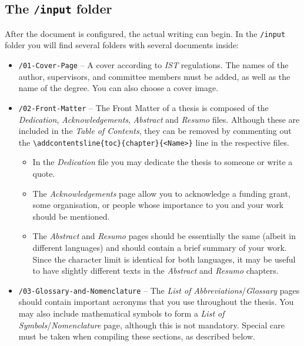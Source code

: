 \subsection{The {\normalfont\texttt{/input}} folder} %

After the document is configured, the actual writing can begin. In the \texttt{/input} folder you will find several folders with several documents inside:

\begin{itemize}
\item \texttt{/01-Cover-Page} -- A cover according to \textit{IST} regulations. The names of the author, supervisors, and committee members must be added, as well as the name of the degree. You can also choose a cover image.

\item \texttt{/02-Front-Matter} -- The Front Matter of a thesis is composed of the \textit{Dedication}, \textit{Acknowledgements}, \textit{Abstract} and \textit{Resumo} files. Although these are included in the \textit{Table of Contents}, they can be removed by commenting out the \Verb*|\addcontentsline{toc}{chapter}{<Name>}| line in the respective files.
	
\begin{itemize}
	\item In the \textit{Dedication} file you may dedicate the thesis to someone or write a quote. 
	
	\item The \textit{Acknowledgements} page allow you to acknowledge a funding grant, some organisation, or people whose importance to you and your work should be mentioned. 
	
	\item The \textit{Abstract} and \textit{Resumo} pages should be essentially the same (albeit in different languages) and should contain a brief summary of your work. Since the character limit is identical for both languages, it may be useful to have slightly different texts in the \textit{Abstract} and \textit{Resumo} chapters. 
\end{itemize}	

\item \texttt{/03-Glossary-and-Nomenclature} -- The \textit{List of Abbreviations}/\textit{Glossary} pages should contain important acronyms that you use throughout the thesis. You may also include mathematical symbols to form a \textit{List of Symbols}/\textit{Nomenclature} page, although this is not mandatory. Special care must be taken when compiling these sections, as described below.


\end{itemize}
